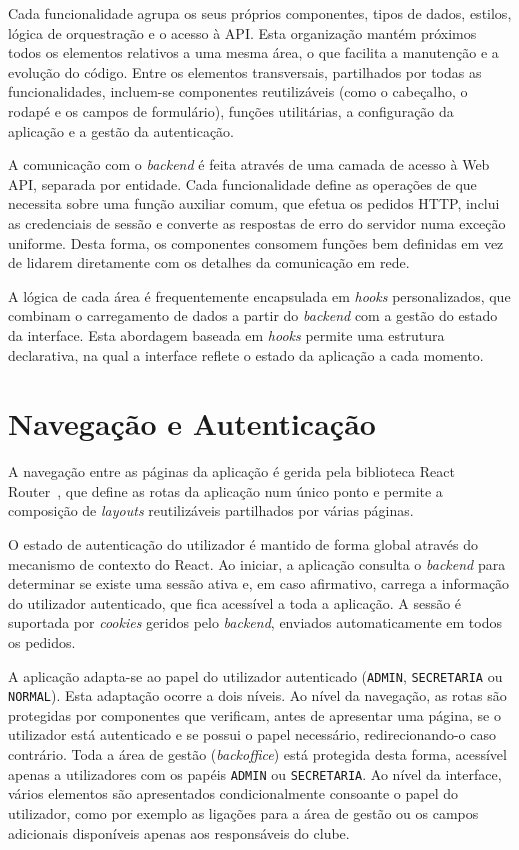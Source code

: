 Cada funcionalidade agrupa os seus próprios componentes, tipos de dados, 
estilos, lógica de orquestração e o acesso à API. Esta organização mantém 
próximos todos os elementos relativos a uma mesma área, o que facilita a 
manutenção e a evolução do código. Entre os elementos transversais, partilhados 
por todas as funcionalidades, incluem-se componentes reutilizáveis (como o 
cabeçalho, o rodapé e os campos de formulário), funções utilitárias, a 
configuração da aplicação e a gestão da autenticação.

A comunicação com o \textit{backend} é feita através de uma camada de acesso à 
Web API, separada por entidade. Cada funcionalidade define as operações de que 
necessita sobre uma função auxiliar comum, que efetua os pedidos HTTP, inclui 
as credenciais de sessão e converte as respostas de erro do servidor numa 
exceção uniforme. Desta forma, os componentes consomem funções bem definidas 
em vez de lidarem diretamente com os detalhes da comunicação em rede.

A lógica de cada área é frequentemente encapsulada em \textit{hooks} 
personalizados, que combinam o carregamento de dados a partir do 
\textit{backend} com a gestão do estado da interface. Esta abordagem baseada em 
\textit{hooks} permite uma estrutura declarativa, na qual a interface reflete o 
estado da aplicação a cada momento.

\section{Navegação e Autenticação}

A navegação entre as páginas da aplicação é gerida pela biblioteca React 
Router~\cite{reactrouter}, que define as rotas da aplicação num único ponto e 
permite a composição de \textit{layouts} reutilizáveis partilhados por várias 
páginas.

O estado de autenticação do utilizador é mantido de forma global através do 
mecanismo de contexto do React. Ao iniciar, a aplicação consulta o 
\textit{backend} para determinar se existe uma sessão ativa e, em caso 
afirmativo, carrega a informação do utilizador autenticado, que fica acessível 
a toda a aplicação. A sessão é suportada por \textit{cookies} geridos pelo 
\textit{backend}, enviados automaticamente em todos os pedidos.

A aplicação adapta-se ao papel do utilizador autenticado (\texttt{ADMIN}, 
\texttt{SECRETARIA} ou \texttt{NORMAL}). Esta adaptação ocorre a dois níveis. 
Ao nível da navegação, as rotas são protegidas por componentes que verificam, 
antes de apresentar uma página, se o utilizador está autenticado e se possui o 
papel necessário, redirecionando-o caso contrário. Toda a área de gestão 
(\textit{backoffice}) está protegida desta forma, acessível apenas a 
utilizadores com os papéis \texttt{ADMIN} ou \texttt{SECRETARIA}. Ao nível da 
interface, vários elementos são apresentados condicionalmente consoante o papel 
do utilizador, como por exemplo as ligações para a área de gestão ou os campos 
adicionais disponíveis apenas aos responsáveis do clube.

